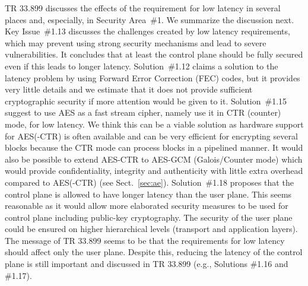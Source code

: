 \documentclass[12pt]{llncs}
\begin{document}
TR 33.899 discusses the effects of the requirement for low latency in several places and, especially, in Security Area~\#1. We summarize the discussion next. 
Key Issue~\#1.13 discusses the challenges created by low latency requirements, which  may prevent using strong security mechanisms and lead to severe vulnerabilities. It concludes that at least the control plane should be fully secured even if this leads to longer latency. 
Solution~\#1.12 claims a solution to the latency problem by using Forward Error Correction (FEC) codes, but it provides very little details and we estimate that it does not provide sufficient cryptographic security if more attention would be given to it. 
Solution~\#1.15 suggest to use AES as a fast stream cipher, namely use it in CTR (counter) mode, for low latency. We think this can be a viable solution as hardware support for AES(-CTR) is often available and can be very efficient for encrypting several blocks because the CTR mode can process blocks in a pipelined manner. %
It would also be possible to extend AES-CTR to AES-GCM (Galois/Counter mode) which would provide confidentiality, integrity and authenticity with little extra overhead compared to AES(-CTR) (see Sect.~\ref{sec:ae}).
Solution~\#1.18 proposes that the control plane is allowed to have longer latency than the user plane. This seems reasonable as it would allow more elaborated security measures to be used for control plane including public-key cryptography. The security of the user plane could be ensured on higher hierarchical levels (transport and application layers). %
The message of TR 33.899 seems to be that the requirements for low latency should affect only the user plane. Despite this, reducing the latency of the control plane is still important and discussed in TR 33.899 (e.g., Solutions \#1.16 and \#1.17).
\end{document}
